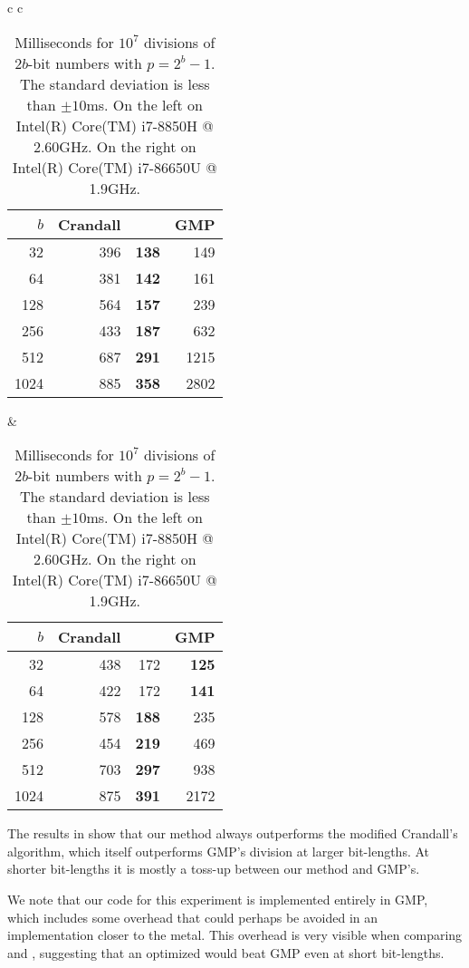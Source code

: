 \begin{table}[H]
   \centering
   \begin{tabular}{ c c }
      \begin{tabular}{ r | r r r }
         $b$ & Crandall & \Cref{alg:division-generalized} & GMP \\
         \hline
         32 & 396 & \textbf   {138}  & 149\\
         64 & 381 &   \textbf {142}  & 161\\
         128 & 564 &  \textbf {157}  & 239\\
         256 & 433 &  \textbf {187}  & 632\\
         512 & 687 &  \textbf {291}  & 1215\\
         1024 & 885 & \textbf {358}  & 2802
      \end{tabular}
      \hspace{.5em}
      &
      \hspace{.5em}
      \begin{tabular}{ r | r r r }
         $b$ & Crandall & \Cref{alg:division-generalized} & GMP \\
         \hline
         32 & 438 & 172 & \textbf{125}\\
         64 & 422 & 172 & \textbf{141}\\
         128 & 578 &      \textbf{188} & 235\\
         256 & 454 &      \textbf{219} & 469\\
         512 & 703 &      \textbf{297} & 938\\
         1024 & 875 &     \textbf{391} & 2172
      \end{tabular}
   \end{tabular}
   \caption{Milliseconds for $10^7$ divisions of $2b$-bit numbers with $p=2^b-1$.
      The standard deviation is less than $\pm10$ms.
         On the left on Intel(R) Core(TM) i7-8850H @ 2.60GHz.
      On the right on Intel(R) Core(TM) i7-86650U @ 1.9GHz.
   }
   \label{tab:division-experiments}
\end{table}

The results in  show that our method always outperforms the modified Crandall's algorithm, which itself outperforms GMP's division at larger bit-lengths.
At shorter bit-lengths it is mostly a toss-up between our method and GMP's.

We note that our code for this experiment is implemented entirely in GMP, which includes some overhead that could perhaps be avoided in an implementation closer to the metal.
This overhead is very visible when comparing  and , suggesting that an optimized  would beat GMP even at short bit-lengths.

